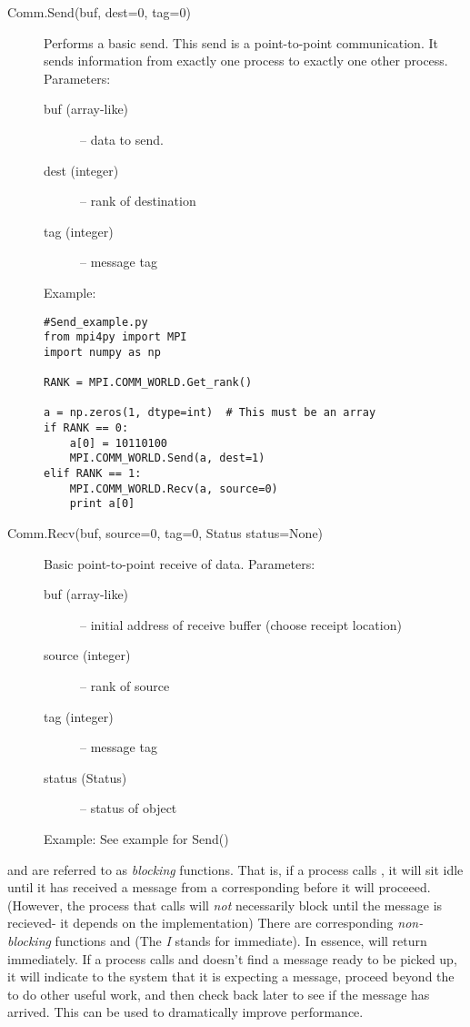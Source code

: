 \begin{description}
\item[Comm.Send(buf, dest=0, tag=0)]
Performs a basic send. This send is a point-to-point communication. It sends information from exactly one process to exactly one other process.
Parameters:
\begin{description}
\item[buf (array-like)] – data to send.
    

\item[dest (integer)] – rank of destination
\item[tag (integer)] – message tag
\end{description}
Example:
\begin{lstlisting}
#Send_example.py
from mpi4py import MPI
import numpy as np

RANK = MPI.COMM_WORLD.Get_rank()

a = np.zeros(1, dtype=int)  # This must be an array
if RANK == 0:
    a[0] = 10110100
    MPI.COMM_WORLD.Send(a, dest=1)
elif RANK == 1:
    MPI.COMM_WORLD.Recv(a, source=0)
    print a[0]
\end{lstlisting} 
\item[Comm.Recv(buf, source=0, tag=0, Status status=None)]
Basic point-to-point receive of data.
Parameters:
\begin{description}
\item[buf (array-like)] – initial address of receive buffer (choose receipt location)
\item[source (integer)] – rank of source
\item[tag (integer)] – message tag
\item[status (Status)] – status of object
\end{description}
Example:
See example for Send()
\end{description}

\begin{info}
 and  are referred to as \emph{blocking} functions. That is, if a process calls , it will sit idle until it has received a message from a corresponding  before it will proceeed. (However, the process that calls  will \emph{not} necessarily block until the message is recieved- it depends on the implementation) There are corresponding \emph{non-blocking} functions  and  (The \emph{I} stands for immediate). In essence,  will return immediately. If a process calls  and doesn't find a message ready to be picked up, it will indicate to the system that it is expecting a message, proceed beyond the  to do other useful work, and then check back later to see if the message has arrived. This can be used to dramatically improve performance.
\end{info}

